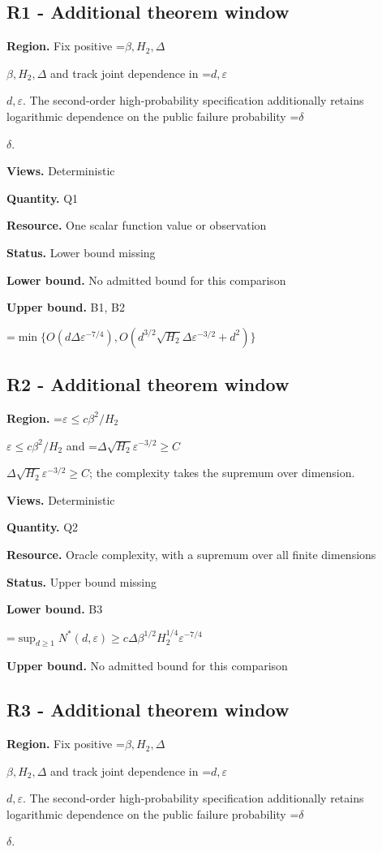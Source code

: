 \documentclass[10pt,a4paper]{article}
\newcommand{\AtlasMath}[1]{\par\begingroup\centering\setbox0=\hbox{$\displaystyle #1$}\ifdim\wd0>1.4\linewidth\typeout{ATLAS WIDE FORMULA: \the\wd0}\fi\ifdim\wd0>\linewidth\resizebox{\linewidth}{!}{\box0}\else\box0\fi\par\endgroup}
\newcommand{\AtlasInlineMath}[1]{\begingroup\setbox0=\hbox{$#1$}\ifdim\wd0>.4\linewidth\endgroup\AtlasMath{#1}\else\endgroup$#1$\fi}
\begin{document}
\subsection{R1 - Additional theorem window}
\textbf{Region.} Fix positive \AtlasInlineMath{\beta,H_2,\Delta} and track joint dependence in \AtlasInlineMath{d,\varepsilon}. The second-order high-probability specification additionally retains logarithmic dependence on the public failure probability \AtlasInlineMath{\delta}.

\textbf{Views.} Deterministic

\textbf{Quantity.} Q1

\textbf{Resource.} One scalar function value or observation

\textbf{Status.} Lower bound missing

\textbf{Lower bound.} No admitted bound for this comparison

\textbf{Upper bound.} B1, B2

\AtlasMath{\min\{O(d\Delta\varepsilon^{-7/4}),O(d^{3/2}\sqrt{H_2}\Delta\varepsilon^{-3/2}+d^2)\}}
\subsection{R2 - Additional theorem window}
\textbf{Region.} \AtlasInlineMath{\varepsilon\le c\beta^2/H_2} and \AtlasInlineMath{\Delta\sqrt{H_2}\varepsilon^{-3/2}\ge C}; the complexity takes the supremum over dimension.

\textbf{Views.} Deterministic

\textbf{Quantity.} Q2

\textbf{Resource.} Oracle complexity, with a supremum over all finite dimensions

\textbf{Status.} Upper bound missing

\textbf{Lower bound.} B3

\AtlasMath{\sup_{d\ge1}N^*(d,\varepsilon)\ge c\Delta\beta^{1/2}H_2^{1/4}\varepsilon^{-7/4}}
\textbf{Upper bound.} No admitted bound for this comparison

\subsection{R3 - Additional theorem window}
\textbf{Region.} Fix positive \AtlasInlineMath{\beta,H_2,\Delta} and track joint dependence in \AtlasInlineMath{d,\varepsilon}. The second-order high-probability specification additionally retains logarithmic dependence on the public failure probability \AtlasInlineMath{\delta}.
\end{document}
